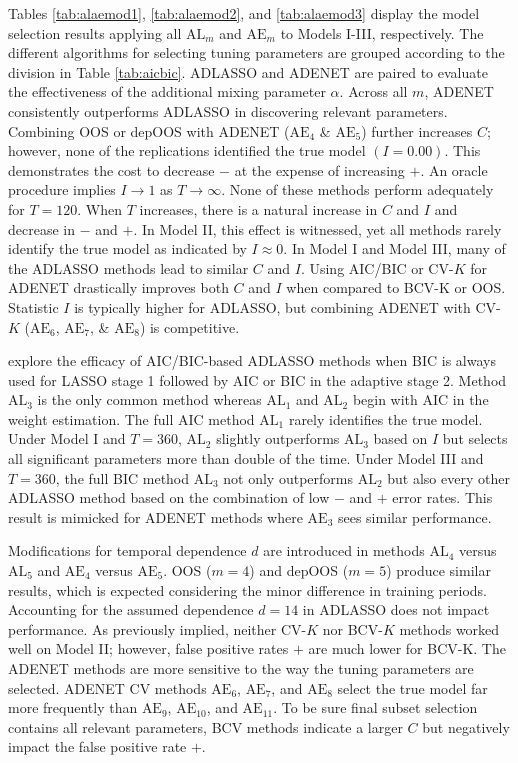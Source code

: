 Tables \ref{tab:alaemod1}, \ref{tab:alaemod2}, and \ref{tab:alaemod3} display the model selection results applying all $\textrm{AL}_m$ and $\textrm{AE}_m$ to Models I-III, respectively. The different algorithms for selecting tuning parameters are grouped according to the division in Table \ref{tab:aicbic}. ADLASSO and ADENET are paired to evaluate the effectiveness of the additional mixing parameter $\alpha$. Across all $m$, ADENET consistently outperforms ADLASSO in discovering relevant parameters. Combining OOS or depOOS with ADENET ($\textrm{AE}_4$ \& $\textrm{AE}_5$) further increases $C$; however, none of the replications identified the true model $(I=0.00)$. This demonstrates the cost to decrease $-$ at the expense of increasing $+$. An oracle procedure implies $I\to 1$ as $T\to\infty$. None of these methods perform adequately for $T=120$. When $T$ increases, there is a natural increase in $C$ and $I$ and decrease in $-$ and $+$. In Model II, this effect is witnessed, yet all methods rarely identify the true model as indicated by $I \approx 0$. In Model I and Model III, many of the ADLASSO methods lead to similar $C$ and $I$.  Using AIC/BIC or CV-$K$ for ADENET drastically improves both $C$ and $I$ when compared to BCV-K or OOS. Statistic $I$ is typically higher for ADLASSO, but combining ADENET with CV-$K$ ($\textrm{AE}_6$, $\textrm{AE}_7$, \& $\textrm{AE}_8$) is competitive.

\cite{Chen2011} explore the efficacy of AIC/BIC-based ADLASSO methods when BIC is always used for LASSO stage 1 followed by AIC or BIC in the adaptive stage 2. Method $\textrm{AL}_3$ is the only common method whereas $\textrm{AL}_1$ and $\textrm{AL}_2$ begin with AIC in the weight estimation. The full AIC method $\textrm{AL}_1$ rarely identifies the true model. Under Model I and $T=360$, $\textrm{AL}_2$ slightly outperforms $\textrm{AL}_3$ based on $I$ but selects all significant parameters more than double of the time. Under Model III and $T=360$, the full BIC method $\textrm{AL}_3$ not only outperforms $\textrm{AL}_2$ but also every other ADLASSO method based on the combination of low $-$ and $+$ error rates. This result is mimicked for ADENET methods where $\textrm{AE}_3$ sees similar performance.

Modifications for temporal dependence $d$ are introduced in methods $\textrm{AL}_4$ versus $\textrm{AL}_5$ and $\textrm{AE}_4$ versus $\textrm{AE}_5$. OOS ($m=4$) and depOOS ($m=5$) produce similar results, which is expected considering the minor difference in training periods. Accounting for the assumed dependence $d=14$ in ADLASSO does not impact performance. As previously implied, neither CV-$K$ nor BCV-$K$ methods worked well on Model II; however,  false positive rates $+$ are much lower for BCV-K. The ADENET methods are more sensitive to the way the tuning parameters are selected. ADENET CV methods $\textrm{AE}_6$, $\textrm{AE}_7$, and $\textrm{AE}_8$ select the true model far more frequently than $\textrm{AE}_9$, $\textrm{AE}_{10}$, and $\textrm{AE}_{11}$. To be sure final subset selection contains all relevant parameters, BCV methods indicate a larger $C$ but negatively impact the false positive rate $+$.


